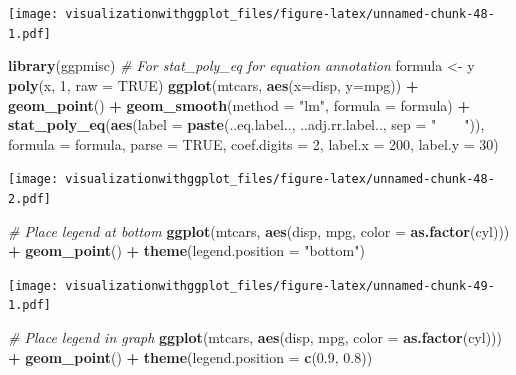 \documentclass[]{krantz}
\makeatletter
\newenvironment{Shaded}{\begin{snugshade}}{\end{snugshade}}
\newcommand{\KeywordTok}[1]{\textcolor[rgb]{0.13,0.29,0.53}{\textbf{#1}}}
\newcommand{\DataTypeTok}[1]{\textcolor[rgb]{0.13,0.29,0.53}{#1}}
\newcommand{\DecValTok}[1]{\textcolor[rgb]{0.00,0.00,0.81}{#1}}
\newcommand{\FloatTok}[1]{\textcolor[rgb]{0.00,0.00,0.81}{#1}}
\newcommand{\StringTok}[1]{\textcolor[rgb]{0.31,0.60,0.02}{#1}}
\newcommand{\CommentTok}[1]{\textcolor[rgb]{0.56,0.35,0.01}{\textit{#1}}}
\newcommand{\OtherTok}[1]{\textcolor[rgb]{0.56,0.35,0.01}{#1}}
\newcommand{\OperatorTok}[1]{\textcolor[rgb]{0.81,0.36,0.00}{\textbf{#1}}}
\newcommand{\NormalTok}[1]{#1}
\newenvironment{kframe}{%
\medskip{}
\setlength{\fboxsep}{.8em}
 \def\at@end@of@kframe{}%
 \ifinner\ifhmode%
  \def\at@end@of@kframe{\end{minipage}}%
  \begin{minipage}{\columnwidth}%
 \fi\fi%
 \def\FrameCommand##1{\hskip\@totalleftmargin \hskip-\fboxsep
 \colorbox{shadecolor}{##1}\hskip-\fboxsep
     \hskip-\linewidth \hskip-\@totalleftmargin \hskip\columnwidth}%
 \MakeFramed {\advance\hsize-\width
   \@totalleftmargin\z@ \linewidth\hsize
   \@setminipage}}%
 {\par\unskip\endMakeFramed%
 \at@end@of@kframe}
\renewenvironment{Shaded}{\begin{kframe}}{\end{kframe}}
\theoremstyle{definition}
\theoremstyle{definition}
\theoremstyle{definition}
\theoremstyle{remark}
\makeatother
\begin{document}
\texttt{[image: visualizationwithggplot\_files/figure-latex/unnamed-chunk-48-1.pdf]}

\begin{Shaded}
\begin{Highlighting}[]
\KeywordTok{library}\NormalTok{(ggpmisc) }\CommentTok{# For stat_poly_eq for equation annotation  }
\NormalTok{formula <-}\StringTok{ }\NormalTok{y }\OperatorTok{~}\StringTok{ }\KeywordTok{poly}\NormalTok{(x, }\DecValTok{1}\NormalTok{, }\DataTypeTok{raw =} \OtherTok{TRUE}\NormalTok{)}
\KeywordTok{ggplot}\NormalTok{(mtcars, }\KeywordTok{aes}\NormalTok{(}\DataTypeTok{x=}\NormalTok{disp, }\DataTypeTok{y=}\NormalTok{mpg)) }\OperatorTok{+}\StringTok{ }
\StringTok{    }\KeywordTok{geom_point}\NormalTok{() }\OperatorTok{+}\StringTok{  }
\StringTok{    }\KeywordTok{geom_smooth}\NormalTok{(}\DataTypeTok{method =} \StringTok{"lm"}\NormalTok{, }\DataTypeTok{formula =}\NormalTok{ formula) }\OperatorTok{+}\StringTok{     }\KeywordTok{stat_poly_eq}\NormalTok{(}\KeywordTok{aes}\NormalTok{(}\DataTypeTok{label =}  \KeywordTok{paste}\NormalTok{(..eq.label.., ..adj.rr.label.., }
        \DataTypeTok{sep =} \StringTok{"~~~~"}\NormalTok{)), }\DataTypeTok{formula =}\NormalTok{ formula, }\DataTypeTok{parse =} \OtherTok{TRUE}\NormalTok{, }\DataTypeTok{coef.digits =} \DecValTok{2}\NormalTok{, }\DataTypeTok{label.x =} \DecValTok{200}\NormalTok{, }\DataTypeTok{label.y =} \DecValTok{30}\NormalTok{)}
\end{Highlighting}
\end{Shaded}

\texttt{[image: visualizationwithggplot\_files/figure-latex/unnamed-chunk-48-2.pdf]}

\begin{Shaded}
\begin{Highlighting}[]
\CommentTok{# Place legend at bottom}
\KeywordTok{ggplot}\NormalTok{(mtcars, }\KeywordTok{aes}\NormalTok{(disp,  mpg, }\DataTypeTok{color =} \KeywordTok{as.factor}\NormalTok{(cyl))) }\OperatorTok{+}\StringTok{ }\KeywordTok{geom_point}\NormalTok{() }\OperatorTok{+}
\KeywordTok{theme}\NormalTok{(}\DataTypeTok{legend.position =} \StringTok{"bottom"}\NormalTok{)}
\end{Highlighting}
\end{Shaded}

\texttt{[image: visualizationwithggplot\_files/figure-latex/unnamed-chunk-49-1.pdf]}

\begin{Shaded}
\begin{Highlighting}[]
\CommentTok{# Place legend in graph}
\KeywordTok{ggplot}\NormalTok{(mtcars, }\KeywordTok{aes}\NormalTok{(disp,  mpg, }\DataTypeTok{color =} \KeywordTok{as.factor}\NormalTok{(cyl))) }\OperatorTok{+}\StringTok{ }\KeywordTok{geom_point}\NormalTok{() }\OperatorTok{+}
\KeywordTok{theme}\NormalTok{(}\DataTypeTok{legend.position =} \KeywordTok{c}\NormalTok{(}\FloatTok{0.9}\NormalTok{, }\FloatTok{0.8}\NormalTok{))}
\end{Highlighting}
\end{Shaded}
\end{document}
